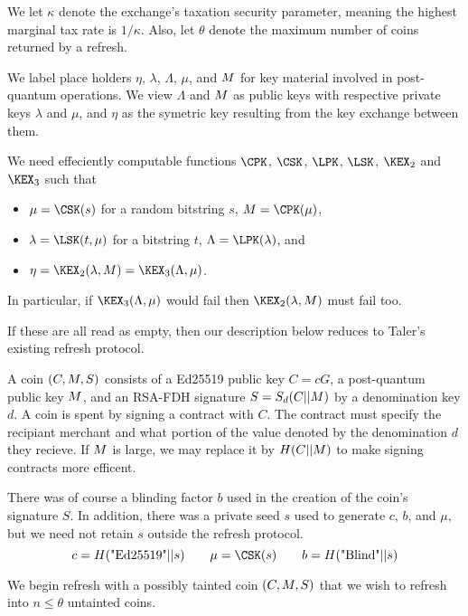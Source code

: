 \documentclass{llncs}
\begin{document}
We let $\kappa$ denote the exchange's taxation security parameter,
meaning the highest marginal tax rate is $1/\kappa$.  Also, let 
$\theta$ denote the maximum number of coins returned by a refresh.

\smallskip

We label place holders $\eta$, $\lambda$, $\Lambda$, $\mu$, and $M$
for key material involved in post-quantum operations.  
We view $\Lambda$ and $M$ as public keys with respective
 private keys $\lambda$ and $\mu$, and
$\eta$ as the symetric key resulting from the key exchange between them.

We need effeciently computable functions
  $\CPK$, $\CSK$, $\LPK$, $\LSK$, $\KEX_2$ and $\KEX_3$  such that 
\begin{itemize}
\item  $\mu = \CSK(s)$ for a random bitstring $s$,
       $\Mu = \CPK(\mu)$,
\item  $\lambda = \LSK(t,\mu)$ for a bitstring $t$, 
       $\Lambda = \LPK(\lambda)$, and
\item $\eta = \KEX_2(\lambda,\Mu) = \KEX_3(\Lambda,\mu)$.
\end{itemize}
In particular, if $\KEX_3(\Lambda,\mu)$ would fail
 then $\KEX_2(\lambda,\Mu)$ must fail too.

If these are all read as empty, then our description below reduces
to Taler's existing refresh protocol. 

\smallskip

A coin $(C,M,S)$ consists of 
  a Ed25519 public key $C = c G$,
  a post-quantum public key $M$, and
  an RSA-FDH signature $S = S_d(C || M)$ by a denomination key $d$.
A coin is spent by signing a contract with $C$.  The contract must
specify the recipiant merchant and what portion of the value denoted
by the denomination $d$ they recieve.
If $M$ is large, we may replace it by $H(C || M)$ to make signing
contracts more efficent.

There was of course a blinding factor $b$ used in the creation of
the coin's signature $S$.  In addition, there was a private seed $s$
used to generate $c$, $b$, and $\mu$, but we need not retain $s$
outside the refresh protocol.
$$ c = H(\textrm{"Ed25519"} || s)
\qquad \mu = \CSK(s)
\qquad b = H(\textrm{"Blind"} || s) $$

\smallskip

We begin refresh with a possibly tainted coin $(C,M,S)$ that
we wish to refresh into $n \le \theta$ untainted coins.  
\end{document}
